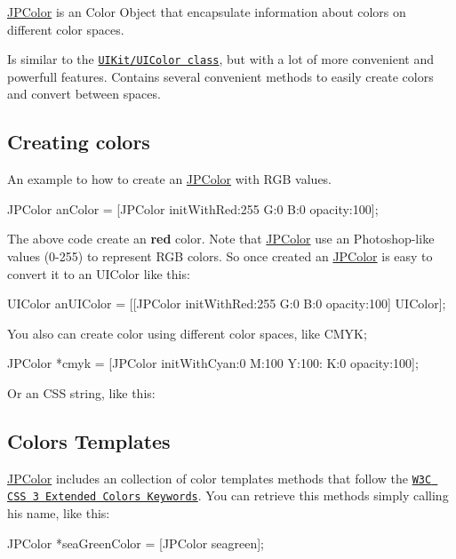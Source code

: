 \hyperlink{interface_j_p_color}{JPColor} is an Color Object that encapsulate information about colors on different color spaces. 

Is similar to the \href{http://developer.apple.com/library/ios/#documentation/uikit/reference/UIColor_Class/Reference/Reference.html}{\tt UIKit/UIColor class}, but with a lot of more convenient and powerfull features. Contains several convenient methods to easily create colors and convert between spaces.

\subsection*{Creating colors }

An example to how to create an \hyperlink{interface_j_p_color}{JPColor} with RGB values. 
\begin{DoxyCode}
 JPColor anColor = [JPColor initWithRed:255 G:0 B:0 opacity:100];
\end{DoxyCode}
 The above code create an {\bfseries red} color. Note that \hyperlink{interface_j_p_color}{JPColor} use an Photoshop-\/like values (0-\/255) to represent RGB colors. So once created an \hyperlink{interface_j_p_color}{JPColor} is easy to convert it to an UIColor like this: 
\begin{DoxyCode}
 UIColor anUIColor = [[JPColor initWithRed:255 G:0 B:0 opacity:100] UIColor];
\end{DoxyCode}
 You also can create color using different color spaces, like CMYK; 
\begin{DoxyCode}
 JPColor *cmyk = [JPColor initWithCyan:0 M:100 Y:100: K:0 opacity:100];
\end{DoxyCode}
 Or an CSS string, like this: 


\subsection*{Colors Templates}

\hyperlink{interface_j_p_color}{JPColor} includes an collection of color templates methods that follow the \href{http://www.w3.org/TR/css3-color/#svg-color}{\tt W3C CSS 3 Extended Colors Keywords}. You can retrieve this methods simply calling his name, like this: 
\begin{DoxyCode}
 JPColor *seaGreenColor = [JPColor seagreen];
\end{DoxyCode}


